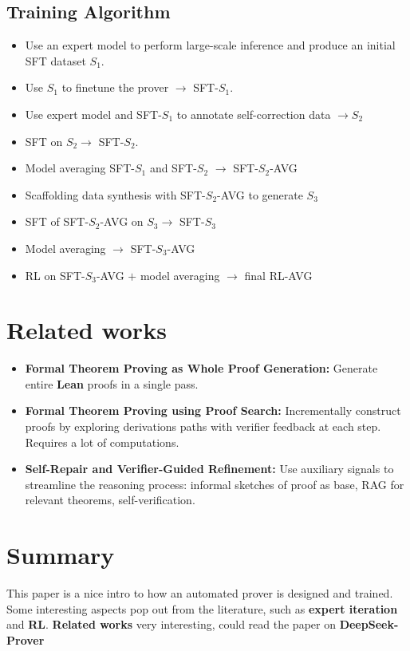 \documentclass{article}
\begin{document}
\subsection{Training Algorithm}
\begin{itemize}
    \item Use an expert model to perform large-scale inference and produce an initial SFT dataset $S_1$.
    \item Use $S_1$ to finetune the prover $\to$ SFT-$S_1$.
    \item Use expert model and SFT-$S_1$ to annotate self-correction data $\to S_2$
    \item SFT on $S_2 \to$ SFT-$S_2$.
    \item Model averaging SFT-$S_1$ and SFT-$S_2$ $\to$ SFT-$S_2$-AVG
    \item Scaffolding data synthesis with SFT-$S_2$-AVG to generate $S_3$
    \item SFT of SFT-$S_2$-AVG on $S_3 \to$ SFT-$S_3$
    \item Model averaging $\to$ SFT-$S_3$-AVG
    \item RL on SFT-$S_3$-AVG $+$ model averaging $\to$ final RL-AVG
\end{itemize}

\section{Related works}
\begin{itemize}
    \item \textbf{Formal Theorem Proving as Whole Proof Generation:} Generate entire \textbf{Lean} proofs in a single pass.
    \item \textbf{Formal Theorem Proving using Proof Search:} Incrementally construct proofs by exploring derivations paths with verifier feedback at each step. Requires a lot of computations.
    \item \textbf{Self-Repair and Verifier-Guided Refinement:} Use auxiliary signals to streamline the reasoning process: informal sketches of proof as base, RAG for relevant theorems, self-verification.
\end{itemize}

\section{Summary}
This paper is a nice intro to how an automated prover is designed and trained. Some interesting aspects pop out from the literature, such as \textbf{expert iteration} and \textbf{RL}.
\textbf{Related works} very interesting, could read the paper on \textbf{DeepSeek-Prover}

\printbibliography
\end{document}
